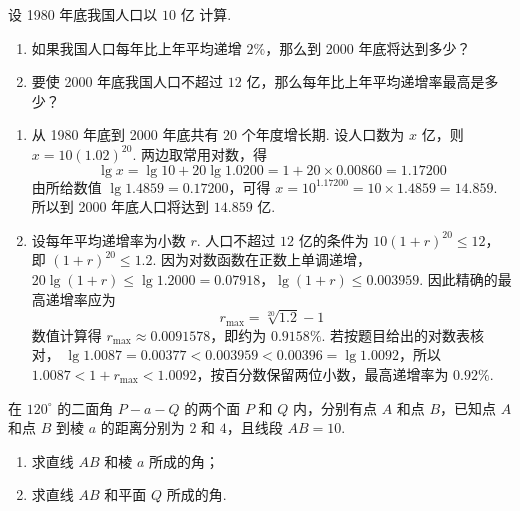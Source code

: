 \begin{problem}
设 1980 年底我国人口以 \(10\text{ 亿}\) 计算.

\begin{enumerate}
\item 如果我国人口每年比上年平均递增 \(2\%\)，那么到 2000 年底将达到多少？
\item 要使 2000 年底我国人口不超过 \(12\text{ 亿}\)，那么每年比上年平均递增率最高是多少？
\end{enumerate}

\begin{center}
\end{center}
\end{problem}

\begin{solution}
\begin{enumerate}
\item 从 1980 年底到 2000 年底共有 \(20\) 个年度增长期. 设人口数为 \(x\) 亿，则
\(x=10(1.02)^{20}\). 两边取常用对数，得
\[
\lg x=\lg10+20\lg1.0200=1+20\times0.00860=1.17200
\]
由所给数值 \(\lg1.4859=0.17200\)，可得 \(x=10^{1.17200}=10\times1.4859=14.859\). 所以到 2000 年底人口将达到 \(14.859\text{ 亿}\).
\item 设每年平均递增率为小数 \(r\). 人口不超过 \(12\) 亿的条件为
\(10(1+r)^{20}\leqslant12\)，即 \((1+r)^{20}\leqslant1.2\). 因为对数函数在正数上单调递增，
\(20\lg(1+r)\leqslant\lg1.2000=0.07918\)，\(\lg(1+r)\leqslant0.003959\).
因此精确的最高递增率应为
\[
r_{\max}=\sqrt[20]{1.2}-1
\]
数值计算得 \(r_{\max}\approx0.0091578\)，即约为 \(0.9158\%\). 若按题目给出的对数表核对，
\(\lg1.0087=0.00377<0.003959<0.00396=\lg1.0092\)，所以
\(1.0087<1+r_{\max}<1.0092\)，按百分数保留两位小数，最高递增率为 \(0.92\%\).
\end{enumerate}
\end{solution}

\begin{problem}
在 \(120^{\circ}\) 的二面角 \(P - a - Q\) 的两个面 \(P\) 和 \(Q\) 内，分别有点 \(A\) 和点 \(B\)，已知点 \(A\) 和点 \(B\) 到棱 \(a\) 的距离分别为 \(2\) 和 \(4\)，且线段 \(AB = 10\).

\begin{enumerate}
\item 求直线 \(AB\) 和棱 \(a\) 所成的角；
\item 求直线 \(AB\) 和平面 \(Q\) 所成的角.
\end{enumerate}
\end{problem}

